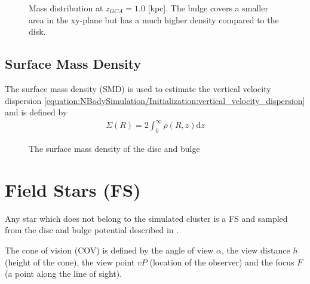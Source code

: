 \documentclass[letterpaper,10pt,english]{sphinxmanual}
\begin{document}
				\begin{figure}[htbp]
				\centering
				\capstart
				
				\noindent{}
				\caption{Mass distribution at \(z_{GCA} = 1.0\) {[}kpc{]}. The bulge covers a smaller area in the xy-plane but has a much higher density compared to the disk.}\label{\detokenize{NBodySimulation/Potential:id10}}\label{\detokenize{NBodySimulation/Potential:fig-potential-mass-distribution}}\end{figure}
			
			
			\subsection{Surface Mass Density}
				\label{\detokenize{NBodySimulation/Potential:surface-mass-density}}
				\sphinxAtStartPar
				The surface mass density (SMD) is used to estimate the vertical velocity dispersion \eqref{equation:NBodySimulation/Initialization:vertical_velocity_dispersion} and is defined by
				\begin{equation}\label{equation:NBodySimulation/Potential:surface_mass_density}
				\begin{split}\Sigma \left ( R \right )=2\int_{0}^{\infty}\rho \left ( R,z \right )\mathrm{d}z\end{split}
				\end{equation}
				\begin{figure}[htbp]
				\centering
				\capstart
				
				\noindent{}
				\caption{The surface mass density of the disc and bulge}\label{\detokenize{NBodySimulation/Potential:id11}}\label{\detokenize{NBodySimulation/Potential:fig-potential-surface-density}}\end{figure}


		\section{Field Stars (FS)}
			\label{\detokenize{NBodySimulation/Initialization:field-stars-fs}}
			\sphinxAtStartPar
			Any star which does not belong to the simulated cluster is a FS and sampled from the disc and bulge potential described in {\hyperref[\detokenize{NBodySimulation/Potential:galactic-potential-label}]{}}.
			
			\sphinxAtStartPar
			The cone of vision (COV) is defined by the angle of view \(\alpha\), the view distance \(h\) (height of the cone), the view point \(vP\) (location of the observer) and the focus \(F\) (a point along the line of sight).
			
\end{document}
